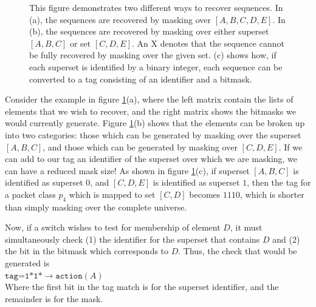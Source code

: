 \begin{figure}[t!]
\begin{minipage}{1\linewidth}
\begin{subfigure}[c]{0.96\linewidth}
\end{subfigure} 
\end{minipage} 
\caption{This figure demonstrates two different ways to recover sequences. In (a), the sequences are recovered by masking over $[A,B,C,D,E]$. In (b), the sequences are recovered by masking over either superset $[A,B,C]$ or set $[C,D,E]$. An X denotes that the sequence cannot be fully recovered by masking over the given set. (c) shows how, if each superset is identified by a binary integer, each sequence can be converted to a tag consisting of an identifier and a bitmask.}
\label{fig:masking}
\end{figure}

Consider the example in figure \ref{fig:masking}(a), where the left matrix contain the lists of elements that we wish to recover, and the right matrix shows the bitmasks we would currently generate. Figure \ref{fig:masking}(b) shows that the elements can be broken up into two categories: those which can be generated by masking over the superset $[A,B,C]$, and those which can be generated by masking over $[C,D,E]$. If we can add to our tag an identifier of the superset over which we are masking, we can have a reduced mask size! As shown in figure \ref{fig:masking}(c), if superset $[A,B,C]$ is identified as superset $0$, and $[C,D,E]$ is identified as superset $1$, then the tag for a packet class $p_4$ which is mapped to set $[C,D]$ becomes $1110$, which is shorter than simply masking over the complete universe.

Now, if a switch wishes to test for membership of element $D$, it must simultaneously check (1) the identifier for the superset that contains $D$ and (2) the bit in the bitmask which corresponds to $D$. Thus, the check that would be generated is\\
\noindent
{%
$\texttt{tag=1*1*} \rightarrow \texttt{action}(A)$\\
}
Where the first bit in the tag match is for the superset identifier, and the
remainder is for the mask.

